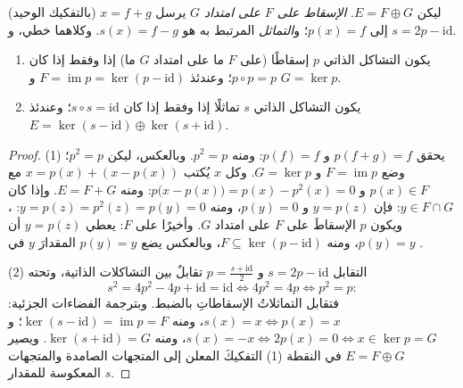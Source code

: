 \begin{definition}\label{def:b1:linmaps:projection}
ليكن $E = F \oplus G$. \emph{الإسقاط على $F$ على امتداد
$G$} يرسل $x = f + g$ (بالتفكيك الوحيد) إلى
$p(x) = f$؛ و\emph{التماثل} المرتبط به هو $s(x)
= f - g$. وكلاهما خطي، و $s = 2p - \mathrm{id}$.
\end{definition}

\begin{theorem}\label{thm:b1:linmaps:projchar}
\begin{enumerate}
  \item يكون التشاكل الذاتي $p$ إسقاطًا (على $F$ ما على امتداد
        $G$ ما) إذا وفقط إذا كان $p \circ p = p$؛ وعندئذ $F =
        \operatorname{im} p = \ker(p - \mathrm{id})$ و $G = \ker
        p$.
  \item يكون التشاكل الذاتي $s$ تماثلًا إذا وفقط إذا كان $s \circ s
        = \mathrm{id}$؛ وعندئذ $E = \ker(s - \mathrm{id}) \oplus
        \ker(s + \mathrm{id})$.
\end{enumerate}
\end{theorem}

\begin{proof}
(1) يحقق  $p(f + g) = f$ و $p(f) = f$: ومنه $p^2 = p$.
وبالعكس، ليكن $p^2 = p$؛ وضع $F = \operatorname{im} p$ و $G = \ker
p$. وكل $x$ يُكتب $x = p(x) + (x - p(x))$ مع $p(x) \in F$ و
$p\bigl(x - p(x)\bigr) = p(x) - p^2(x) = 0$: ومنه $E = F + G$. وإذا كان $y \in
F \cap G$: فإن $y = p(z)$ و $p(y) = 0$، ومنه $y = p(z) = p^2(z) = p(y) =
0$: ، ويكون $p$ الإسقاطَ على $F$ على امتداد $G$.
وأخيرًا على $F$: يعطي $y = p(z)$ أن $p(y) = y$، ومنه $F \subseteq
\ker(p - \mathrm{id})$، وبالعكس يضع $p(y) = y$ المقدارَ $y$ في
.

(2) التقابل $s = 2p - \mathrm{id}$ و $p = \frac{s +
\mathrm{id}}2$ تقابلٌ بين التشاكلات الذاتية، وتحته
\[
s^2 = 4p^2 - 4p + \mathrm{id} = \mathrm{id}
\iff 4p^2 = 4p \iff p^2 = p :
\]
فتقابل التماثلاتُ الإسقاطاتِ بالضبط. وبترجمة
الفضاءات الجزئية: $s(x) = x \iff p(x) = x$، ومنه $\ker(s - \mathrm{id}) =
\operatorname{im} p = F$؛ و $s(x) = -x \iff 2p(x) = 0 \iff x
\in \ker p = G$، ومنه $\ker(s + \mathrm{id}) = G$. ويصير 
$E = F \oplus G$ في النقطة (1) التفكيكَ المعلن
إلى المتجهات الصامدة والمتجهات المعكوسة للمقدار $s$.
\end{proof}

